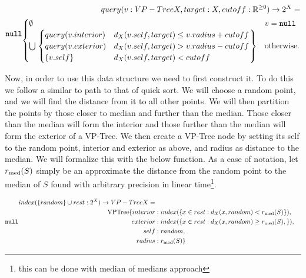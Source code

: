 \begin{align*}
query(v : VP-Tree X, target : X, cutoff : \Rnn) \to 2^X = \\ \begin{cases}
    \emptyset & v = \null \\ 
    \bigcup \left.\begin{cases}
        query(v.interior) & d_X(v.self, target) \le v.radius + cutoff \\ 
        query(v.exterior) & d_X(v.self, target) > v.radius - cutoff \\ 
        \{v.self\} & d_X(v.self, target) < cutoff
    \end{cases}\right\} & \otw 
\end{cases}
\end{align*}

Now, in order to use this data structure we need to first construct it.
To do this we follow a similar to path to that of quick sort.
We will choose a random point, and we will find the distance from it to all other points.
We will then partition the points by those closer to median and further than the median.
Those closer than the median will form the interior and those further than the median will form the exterior of a VP-Tree.
We then create a VP-Tree node by setting its self to the random point, interior and exterior as above, 
and radius as distance to the median. 
We will formalize this with the below function.
As a ease of notation, let $r_{\text{med}}(S)$ simply be an approximate the distance from the random point to the 
median of $S$ found with arbitrary precision in linear time\footnote{this can be done with median of medians approach}.

\begin{align*}
index(\{random\} \cup rest: 2^X) \to VP-Tree X = \\ 
\text{VPTree}\{interior&:index(\{x \in rest : d_X(x, random) < \mradius{S}\}), \\
exterior&:index(\{x \in rest : d_X(x, random) \ge \mradius{S}, \}),\\ 
self&:random,\\
radius&:\mradius{S}\}
\end{align*}